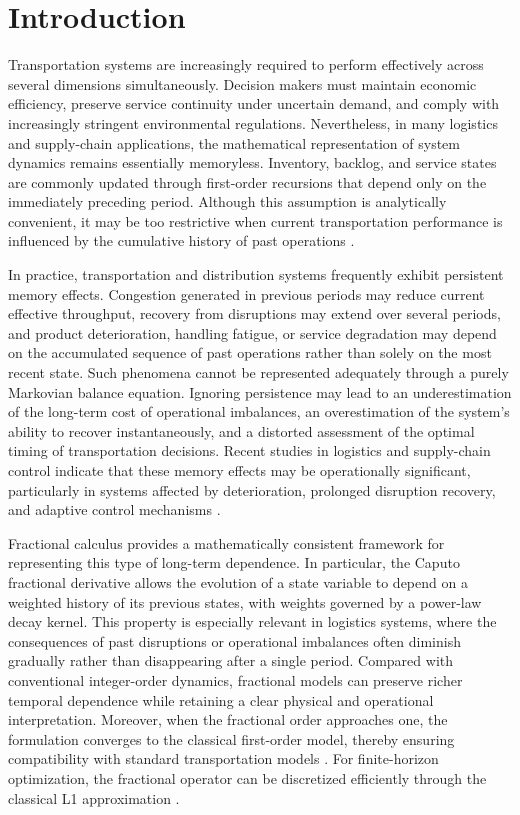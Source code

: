 \section{Introduction}
\label{sec:introduction}

Transportation systems are increasingly required to perform effectively across several dimensions simultaneously. Decision makers must maintain economic efficiency, preserve service continuity under uncertain demand, and comply with increasingly stringent environmental regulations. Nevertheless, in many logistics and supply-chain applications, the mathematical representation of system dynamics remains essentially memoryless. Inventory, backlog, and service states are commonly updated through first-order recursions that depend only on the immediately preceding period. Although this assumption is analytically convenient, it may be too restrictive when current transportation performance is influenced by the cumulative history of past operations \cite{birge2011,shapiro2009}.

In practice, transportation and distribution systems frequently exhibit persistent memory effects. Congestion generated in previous periods may reduce current effective throughput, recovery from disruptions may extend over several periods, and product deterioration, handling fatigue, or service degradation may depend on the accumulated sequence of past operations rather than solely on the most recent state. Such phenomena cannot be represented adequately through a purely Markovian balance equation. Ignoring persistence may lead to an underestimation of the long-term cost of operational imbalances, an overestimation of the system's ability to recover instantaneously, and a distorted assessment of the optimal timing of transportation decisions. Recent studies in logistics and supply-chain control indicate that these memory effects may be operationally significant, particularly in systems affected by deterioration, prolonged disruption recovery, and adaptive control mechanisms \cite{cuong2023,haque2026}.

Fractional calculus provides a mathematically consistent framework for representing this type of long-term dependence. In particular, the Caputo fractional derivative allows the evolution of a state variable to depend on a weighted history of its previous states, with weights governed by a power-law decay kernel. This property is especially relevant in logistics systems, where the consequences of past disruptions or operational imbalances often diminish gradually rather than disappearing after a single period. Compared with conventional integer-order dynamics, fractional models can preserve richer temporal dependence while retaining a clear physical and operational interpretation. Moreover, when the fractional order approaches one, the formulation converges to the classical first-order model, thereby ensuring compatibility with standard transportation models \cite{caputo1967,podlubny1999,diethelm2010}. For finite-horizon optimization, the fractional operator can be discretized efficiently through the classical L1 approximation \cite{lin2007}.

